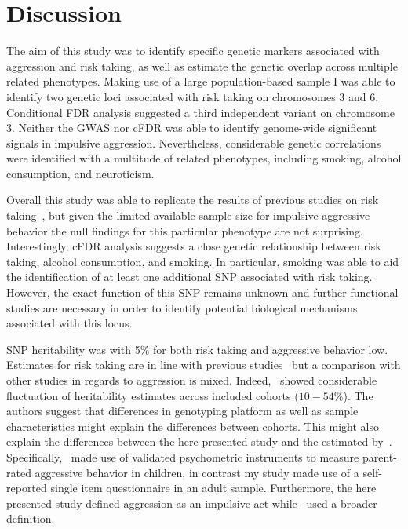 \section{Discussion}
\label{sec:ukb_assc_discussion}

The aim of this study was to identify specific genetic markers associated with aggression and risk taking,
as well as estimate the genetic overlap across multiple related phenotypes.
Making use of a large population-based sample I was able to identify two genetic loci associated with risk taking on chromosomes 3 and 6.
Conditional FDR analysis suggested a third independent variant on chromosome 3.
Neither the GWAS nor cFDR was able to identify genome-wide significant signals in impulsive aggression.
Nevertheless, considerable genetic correlations were identified with a multitude of related phenotypes, including smoking, alcohol consumption, and neuroticism.

Overall this study was able to replicate the results of previous studies on risk taking~\cite{Day2016}, but given the limited available sample size for impulsive aggressive behavior the null findings for this particular phenotype are not surprising.
Interestingly, cFDR analysis suggests a close genetic relationship between risk taking, alcohol consumption, and smoking.
In particular, smoking was able to aid the identification of at least one additional SNP associated with risk taking.
However, the exact function of this SNP remains unknown and further functional studies are necessary in order to identify potential biological mechanisms associated with this locus.

SNP heritability was with 5\% for both risk taking and aggressive behavior low.
Estimates for risk taking are in line with previous studies~\cite{Day2016} but a comparison with other studies in regards to aggression is mixed.
Indeed,~\citet{Pappa2016a} showed considerable fluctuation of heritability estimates across included cohorts ($10-54\%$). 
The authors suggest that differences in genotyping platform as well as sample characteristics might explain the differences between cohorts.
This might also explain the differences between the here presented study and the estimated by~\citet{Pappa2016a}.
Specifically,~\citet{Pappa2016a} made use of validated psychometric instruments to measure parent-rated aggressive behavior in children, in contrast my study made use of a self-reported single item questionnaire in an adult sample.
Furthermore, the here presented study defined aggression as an impulsive act while~\citet{Pappa2016a} used a broader definition.

